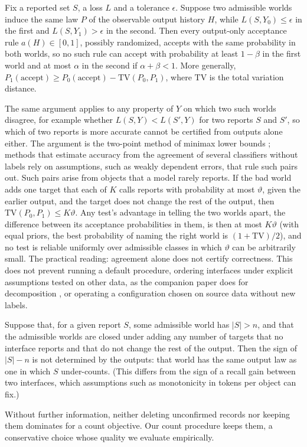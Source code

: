 \begin{proposition}\label{prop:nocert}
Fix a reported set $S$, a loss $L$ and a tolerance $\epsilon$. Suppose two admissible worlds induce the same law $P$ of the observable output history $H$, while $L(S,Y_0)\le\epsilon$ in the first and $L(S,Y_1)>\epsilon$ in the second. Then every output-only acceptance rule $a(H)\in[0,1]$, possibly randomized, accepts with the same probability in both worlds, so no such rule can accept with probability at least $1-\beta$ in the first world and at most $\alpha$ in the second if $\alpha+\beta<1$. More generally, $P_1(\text{accept})\ge P_0(\text{accept})-\mathrm{TV}(P_0,P_1)$, where $\mathrm{TV}$ is the total variation distance.
\end{proposition}
The same argument applies to any property of $Y$ on which two such worlds disagree, for example whether $L(S,Y)<L(S',Y)$ for two reports $S$ and $S'$, so which of two reports is more accurate cannot be certified from outputs alone either. The argument is the two-point method of minimax lower bounds \citep{tsybakov2009nonparametric}; methods that estimate accuracy from the agreement of several classifiers without labels \citep{platanios2014unlabeled} rely on assumptions, such as weakly dependent errors, that rule such pairs out. Such pairs arise from objects that a model rarely reports. If the bad world adds one target that each of $K$ calls reports with probability at most $\vartheta$, given the earlier output, and the target does not change the rest of the output, then $\mathrm{TV}(P_0,P_1)\le K\vartheta$. Any test's advantage in telling the two worlds apart, the difference between its acceptance probabilities in them, is then at most $K\vartheta$ (with equal priors, the best probability of naming the right world is $(1+\mathrm{TV})/2$), and no test is reliable uniformly over admissible classes in which $\vartheta$ can be arbitrarily small. The practical reading: agreement alone does not certify correctness. This does not prevent running a default procedure, ordering interfaces under explicit assumptions tested on other data, as the companion paper does for decomposition \citep{shi2026zoomin}, or operating a configuration chosen on source data without new labels.

\begin{corollary}\label{cor:nonid}
Suppose that, for a given report $S$, some admissible world has $|S|>n$, and that the admissible worlds are closed under adding any number of targets that no interface reports and that do not change the rest of the output. Then the sign of $|S|-n$ is not determined by the outputs: that world has the same output law as one in which $S$ under-counts. (This differs from the sign of a recall gain between two interfaces, which assumptions such as monotonicity in tokens per object can fix.)
\end{corollary}
Without further information, neither deleting unconfirmed records nor keeping them dominates for a count objective. Our count procedure keeps them, a conservative choice whose quality we evaluate empirically.
